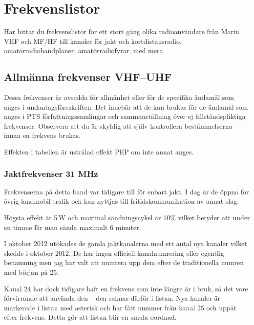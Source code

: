 \chapter{Frekvenslistor}

Här hittar du frekvenslistor för ett stort gäng olika radioanvändare från Marin VHF och MF/HF till kanaler för jakt och kortdistansradio, amatörradiobandplaner, amatörradiofyrar,  med mera.

\clearpage

\section{Allmänna frekvenser VHF--UHF}

Dessa frekvenser är avsedda för allmänhet eller för de specifika ända\-mål som
anges i undantagsföreskriften. Det innebär att de kan brukas för de ändamål
som anges i PTS för\-fatt\-nings\-sam\-ling\-ar och sammanställning över ej
tillståndspliktiga frekvenser. Observera att du är skyldig att själv
kontrollera bestämmelserna innan en frekvens brukas.

Effekten i tabellen är ustrålad effekt PEP om inte annat anges.

\subsection{Jaktfrekvenser 31 MHz}

Frekvenserna på detta band var tidigare till för enbart jakt. I dag är de
öppna för övrig landmobil trafik och kan nyttjas till fritidskommunikation av
annat slag.

Högsta effekt är 5\,W och maximal sändningscykel är 10\% vilket betyder att
under en timme får man sända maximalt 6 minuter.

I oktober 2012 utökades de gamla jaktkanalerna med ett antal nya kanaler
vilket skedde i oktober 2012. De har ingen officiell kanalnumrering eller
egentlig benämning men jag har valt att numrera upp dem efter de traditionella
numren med början på 25.

Kanal 24 har dock tidigare haft en frekvens som inte längre är i bruk, så det
vore förvirrande att använda den -- den saknas därför i listan. Nya kanaler är
markerade i listan med asterisk och har fått nummer från kanal 25 och uppåt
efter frekvens. Detta gör att listan blir en smula oordnad.


